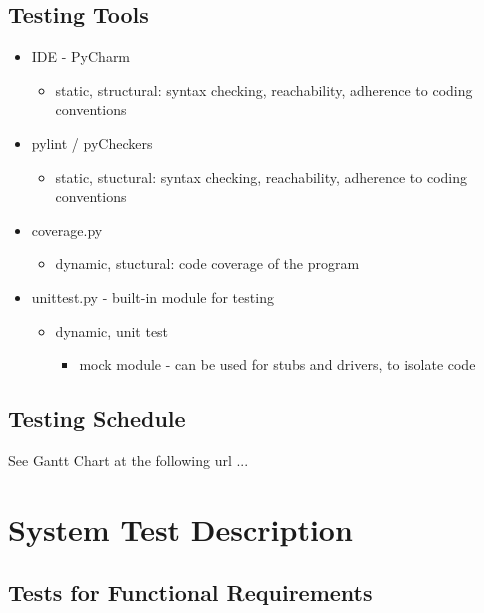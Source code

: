 \documentclass[12pt, titlepage]{article}
\begin{document}
	\subsection{Testing Tools}
	\begin{itemize}
		\itemsep0em
		\item IDE - PyCharm
		\vspace{-3mm}
		\begin{itemize}
			\item static, structural: syntax checking, reachability, adherence 
			to coding conventions
		\end{itemize}
		\item pylint / pyCheckers
		\vspace{-3mm}
		\begin{itemize}
			\item static, stuctural: syntax checking, reachability, adherence 
			to coding conventions
		\end{itemize}
		\item coverage.py
		\vspace{-3mm}
		\begin{itemize}
			\item dynamic, stuctural: code coverage of the program
		\end{itemize}
		\item unittest.py - built-in module for testing
		\vspace{-3mm}
		\begin{itemize}
			\item dynamic, unit test
			\vspace{-2mm}
			\begin{itemize}
				\item mock module - can be used for stubs and drivers, to 
				isolate code
			\end{itemize}
		\end{itemize}
	\end{itemize}
		
	\subsection{Testing Schedule}
	
	See Gantt Chart at the following url ...
	\section{System Test Description}
	
	\subsection{Tests for Functional Requirements}
\end{document}
